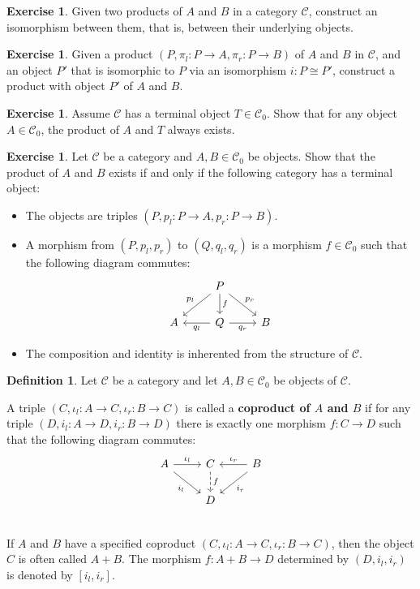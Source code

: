 \documentclass[a4paper,10pt]{scrartcl}
\theoremstyle{plain}
\theoremstyle{definition}
\newtheorem{dfn}[thm]{Definition}
\newtheorem{exer}[thm]{Exercise}
\newcommand{\Cat}[1]{\mathcal{#1}}
\newcommand{\CC}{\Cat{C}}
\newcommand{\Ob}[1]{{#1}_0}
\newcommand{\inl}{\ensuremath{\iota_l}}
\newcommand{\inr}{\ensuremath{\iota_r}}
\newcommand{\projl}{\ensuremath{\pi_l}}
\newcommand{\projr}{\ensuremath{\pi_r}}
\begin{document}
\begin{exer}\label{exer:product-unique}
  Given two products of $A$ and $B$ in a category $\CC$, construct an isomorphism between them, that is, between their underlying objects.
\end{exer}

\begin{exer}
  Given a product $(P,\projl : P \to A ,\projr : P \to B)$ of $A$ and $B$ in $\CC$, and an object $P'$ that is isomorphic to $P$ via an isomorphism $i : P \cong P'$, construct a product with object $P'$ of $A$ and $B$.
\end{exer}

\begin{exer} Assume $\CC$ has a terminal object $T\in\Ob{\CC}$. Show that for any object $A\in \Ob{\CC}$, the product of $A$ and $T$ always exists.
\end{exer}

\begin{exer} Let $\CC$ be a category and $A,B\in\Ob{\CC}$ be objects. Show that the product of $A$ and $B$ exists if and only if the following category has a terminal object:
\begin{itemize}
\item The objects are triples $(P,p_l: P\to A, p_r:P\to B)$.
\item A morphism from $(P,p_l,p_r)$ to $(Q,q_l,q_r)$ is a morphism $f\in\Ob{\CC}$ such that the following diagram commutes:
\[
\begin{tikzcd}
& P \arrow[ld,swap, "p_l"] \arrow[rd, "p_r"] \arrow[d, "f"] & \\
A & Q \arrow[l, "q_l"]  \arrow[r,swap, "q_r"] & B
\end{tikzcd}
\]
\item The composition and identity is inherented from the structure of $\CC$.
\end{itemize}
\end{exer}

\begin{dfn}
   Let $\CC$ be a category and let $A,B \in \Ob\CC$ be objects of $\CC$.

  A triple $(C,\inl : A \to C,\inr : B \to C)$ is called a \textbf{coproduct of $A$ and $B$} if for any triple $(D,i_l : A \to D, i_r : B \to D)$ there is exactly one morphism $f : C \to D$ such that the following diagram commutes:
  \[
    \begin{tikzcd}
      A \ar[r, "\inl"] \ar[rd, "i_l"']
      &
      C  \ar[d, dashed, "f"]
      &
      B \ar[l, "\inr"'] \ar[ld, "i_r"]
      \\
      &
      D %
      &
      \\
    \end{tikzcd}
  \]
  If $A$ and $B$ have a specified coproduct $(C,\inl : A \to C,\inr : B \to C)$, then the object $C$ is often called $A + B$.
  The morphism $f : A + B \to D$ determined by $(D, i_l, i_r)$ is denoted by $[ i_l, i_r]$.
  
\end{dfn}
\end{document}
